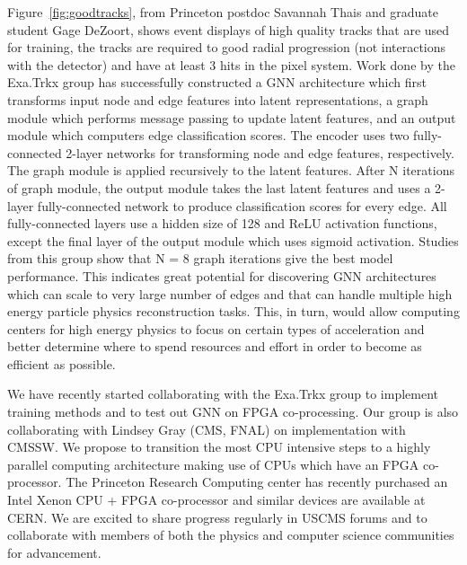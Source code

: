 \documentclass[preprint,12pt]{elsarticle}
\begin{document}
Figure~\ref{fig:goodtracks}, from Princeton postdoc Savannah Thais and graduate student Gage DeZoort,
shows event displays of high quality tracks that are used for training, the tracks are required to
good radial progression (not interactions with the detector) and  have at least 3 hits in the pixel system.
Work done by the Exa.Trkx group \cite{calafiura}
has successfully constructed a GNN architecture which first transforms input node and edge
features into latent representations, a graph module which performs message passing to
update latent features, and an output module which computers edge classification scores.
The encoder uses two fully-connected 2-layer networks for transforming node and edge
features, respectively. The graph module is applied recursively to the latent features.
After N iterations of graph module, the output module takes the last latent features
and uses a 2-layer fully-connected network to produce classification scores for every
edge. All fully-connected layers use a hidden size of 128 and ReLU activation functions,
except the final layer of the output module which uses sigmoid activation.
Studies from this group show that N = 8 graph iterations give the best model
performance.
This indicates great potential for discovering GNN architectures which can scale 
to very large number of edges and that can handle multiple high energy particle 
physics reconstruction tasks. This, in turn, would allow computing centers for 
high energy physics to focus on certain types of acceleration and better determine 
where to spend resources and effort in order to become as efficient as possible.

We have recently started collaborating with the Exa.Trkx group to implement training methods
and to test out GNN on FPGA co-processing.
Our group is also collaborating with Lindsey Gray (CMS, FNAL) on implementation with CMSSW.
We propose to transition the most CPU intensive steps %
to a highly parallel computing architecture making use of CPUs which have an FPGA co-processor.
The Princeton Research Computing center has recently purchased an Intel Xenon CPU + FPGA co-processor
and similar devices are available at CERN. We are excited to share progress regularly 
in USCMS forums and to collaborate with members of 
both the physics and computer science communities for advancement. 


\end{document}
